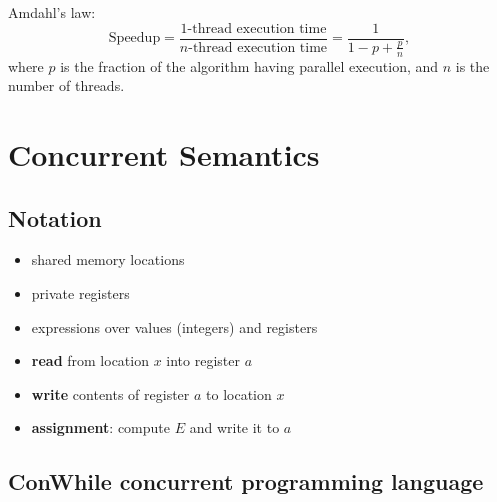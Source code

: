 \documentclass[twocolumn,landscape,10pt]{article}
\theoremstyle{definition}
\begin{document}
Amdahl's law:
\[
    \text{Speedup} = \frac{\text{1-thread execution time}}
    {n\text{-thread execution time}}
    = \frac{1}{1-p+\frac{p}{n}},
\]
where $p$ is the fraction of the algorithm having parallel execution, and $n$ is
the number of threads.

\newpage
\section{Concurrent Semantics}

\subsection{Notation}

\begin{itemize}
    \item{} shared memory locations
    \item{} private registers
    \item{} expressions over values
                (integers) and registers
    \item{} \textbf{read} from location $x$ into
            register $a$
    \item{} \textbf{write} contents of register $a$ to
            location $x$
    \item{} \textbf{assignment}: compute $E$ and write
            it to $a$
\end{itemize} 

\subsection{ConWhile concurrent programming language}
\end{document}

